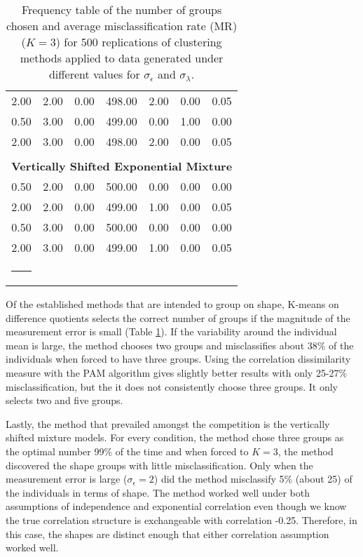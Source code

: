 \documentclass[12pt]{article}
\makeatletter
\newcommand{\thickhline}{%
    \noalign {\ifnum 0=`}\fi \hrule height 1.5pt
    \futurelet \reserved@a \@xhline
}
\makeatother
\begin{document}
\begin{table}[ht]
\begin{center}
\begin{tabular}{ccccccc}
  2.00 & 2.00 & 0.00 & 498.00 & 2.00 & 0.00 & 0.05 \\ 
  0.50 & 3.00 & 0.00 & 499.00 & 0.00 & 1.00 & 0.00 \\ 
  2.00 & 3.00 & 0.00 & 498.00 & 2.00 & 0.00 & 0.05 \\ 
   \\ \multicolumn{7}{c}{\textbf{Vertically Shifted Exponential Mixture}}\\0.50 & 2.00 & 0.00 & 500.00 & 0.00 & 0.00 & 0.00 \\ 
  2.00 & 2.00 & 0.00 & 499.00 & 1.00 & 0.00 & 0.05 \\ 
  0.50 & 3.00 & 0.00 & 500.00 & 0.00 & 0.00 & 0.00 \\ 
  2.00 & 3.00 & 0.00 & 499.00 & 1.00 & 0.00 & 0.05 \\ 
   \thickhline\end{tabular}
\caption{Frequency table of the number of groups chosen and average misclassification rate (MR) ($K=3$) for 500 replications of clustering methods applied to data generated under different values for $\sigma_{\epsilon}$ and $\sigma_{\lambda}$.}
\label{tab:freq1}
\end{center}
\end{table}

Of the established methods that are intended to group on shape, K-means on difference quotients selects the correct number of groups if the magnitude of the measurement error is small (Table \ref{tab:freq1}). If the variability around the individual mean is large, the method chooses two groups and misclassifies about 38\% of the individuals when forced to have three groups. Using the correlation dissimilarity measure with the PAM algorithm gives slightly better results with only 25-27\% misclassification, but the it does not consistently choose three groups. It only selects two and five groups.

Lastly, the method that prevailed amongst the competition is the vertically shifted mixture models. For every condition, the method chose three groups as the optimal number 99\% of the time and when forced to $K=3$, the method discovered the shape groups with little misclassification. Only when the measurement error is large ($\sigma_{\epsilon}=2$) did the method misclassify 5\% (about 25) of the individuals in terms of shape. The method worked well under both assumptions of independence and exponential correlation even though we know the true correlation structure is exchangeable with correlation -0.25. Therefore, in this case, the shapes are distinct enough that either correlation assumption worked well.
\end{document}
